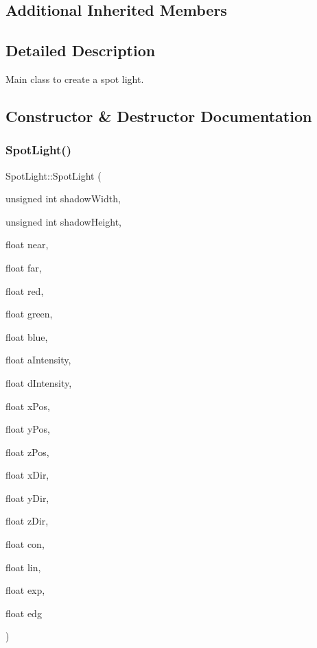 \subsection*{Additional Inherited Members}


\subsection{Detailed Description}
Main class to create a spot light. 

\subsection{Constructor \& Destructor Documentation}
\mbox{\label{class_spot_light_a3c6af5cf0f784ab6375f0e12eb72dd55}} 
\subsubsection{\texorpdfstring{SpotLight()}{SpotLight()}}
{\footnotesize\ttfamily Spot\+Light\+::\+Spot\+Light (\begin{DoxyParamCaption}\item[{unsigned int}]{shadow\+Width,  }\item[{unsigned int}]{shadow\+Height,  }\item[{float}]{near,  }\item[{float}]{far,  }\item[{float}]{red,  }\item[{float}]{green,  }\item[{float}]{blue,  }\item[{float}]{a\+Intensity,  }\item[{float}]{d\+Intensity,  }\item[{float}]{x\+Pos,  }\item[{float}]{y\+Pos,  }\item[{float}]{z\+Pos,  }\item[{float}]{x\+Dir,  }\item[{float}]{y\+Dir,  }\item[{float}]{z\+Dir,  }\item[{float}]{con,  }\item[{float}]{lin,  }\item[{float}]{exp,  }\item[{float}]{edg }\end{DoxyParamCaption})}

